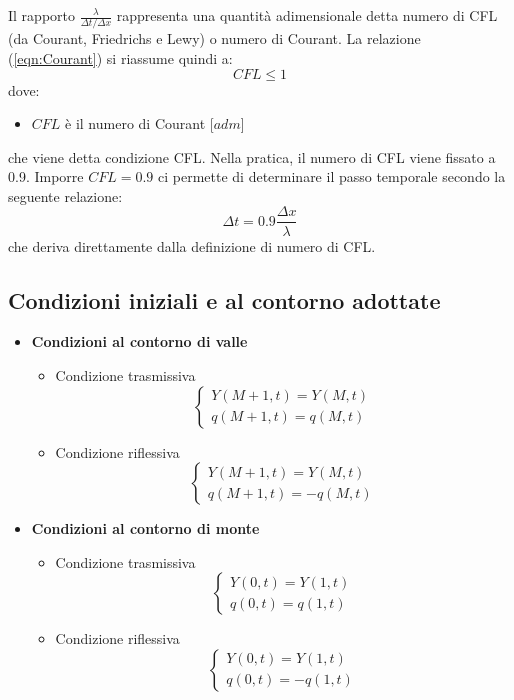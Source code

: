 \documentclass[12pt]{article} %
\begin{document}
\noindent Il rapporto $\frac{\lambda}{\Delta t/\Delta x}$ rappresenta una quantità adimensionale detta numero di CFL (da Courant, Friedrichs e Lewy) o numero di Courant. La relazione (\ref{eqn:Courant}) si riassume quindi a: 
\begin{equation}
    CFL\leq1
\end{equation}
\noindent dove:
\begin{itemize}
\item $CFL$ è il numero di Courant [$adm$]
\end{itemize}
\noindent  che viene detta condizione CFL. Nella pratica, il numero di CFL viene fissato a 0.9.
Imporre $CFL=0.9$ ci permette di determinare il passo temporale secondo la seguente relazione:
\begin{equation}
    \Delta t=0.9\frac{\Delta x}{\lambda}
\end{equation}
\noindent che deriva direttamente dalla definizione di numero  di CFL.

\subsection{Condizioni iniziali e al contorno adottate}
\begin{itemize}
\item\textbf{Condizioni al contorno di valle}
\begin{itemize}
    \item Condizione trasmissiva
    \begin{equation}
        \begin{cases}
        Y(M+1,t)=Y(M,t)\\
        q(M+1,t)=q(M,t)
        \end{cases}
    \end{equation}
    \item Condizione riflessiva
    \begin{equation}
        \begin{cases}
        Y(M+1,t)=Y(M,t)\\
        q(M+1,t)=-q(M,t)
        \end{cases}
    \end{equation}
\end{itemize}
\item\textbf{Condizioni al contorno di monte}
\begin{itemize}
    \item Condizione trasmissiva
    \begin{equation}
        \begin{cases}
        Y(0,t)=Y(1,t)\\
        q(0,t)=q(1,t)
        \end{cases}
\end{equation}
    \item Condizione riflessiva
    \begin{equation}
        \begin{cases}
        Y(0,t)=Y(1,t)\\
        q(0,t)=-q(1,t)
        \end{cases}
    \end{equation}
\end{itemize}
\end{itemize}
\end{document}
